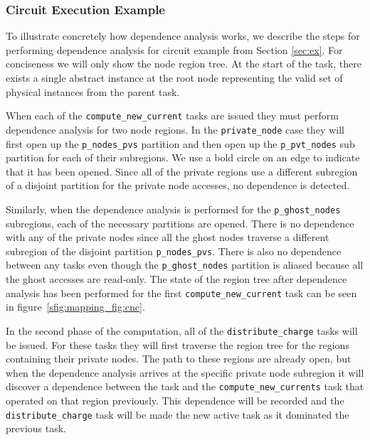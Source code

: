 \subsubsection{Circuit Execution Example}
\label{subsec:cirdependence}
To illustrate concretely how dependence analysis works, we describe the steps for
performing dependence analysis for circuit example from Section \ref{sec:ex}.  
For conciseness we will only show the node region tree.  At the start of the task, there exists
a single abstract instance at the root node representing the valid set of physical
instances from the parent task. 

When each of the {\tt compute\_new\_current} tasks are issued they must perform dependence
analysis for two node regions.  In the {\tt private\_node} case they will first open
up the {\tt p\_nodes\_pvs} partition and then open up the {\tt p\_pvt\_nodes} sub partition
for each of their subregions.  We use a bold circle on an edge to indicate that it has been
opened.  Since all of the private regions use a different subregion
of a disjoint partition for the private node accesses, no dependence is detected.  

Similarly, when the dependence analysis is performed for the {\tt p\_ghost\_nodes} subregions,
each of the necessary partitions are opened.  There is no dependence with any of the private
nodes since all the ghost nodes traverse a different subregion of the disjoint partition
{\tt p\_nodes\_pvs}.  There is also no dependence between any tasks even though the
{\tt p\_ghost\_nodes} partition is aliased because all the ghost accesses are read-only.
The state of the region tree after dependence analysis has been performed for the first
{\tt compute\_new\_current} task can be seen in figure~\ref{sfig:mapping_fig:cnc}.

In the second phase of the computation, all of the {\tt distribute\_charge} tasks
will be issued.  For these tasks they will first traverse the region tree
for the regions containing their private nodes.  The path to these regions are
already open, but when the dependence analysis arrives at the specific private node subregion it will
discover a dependence between the task and the {\tt compute\_new\_currents} task that operated
on that region previously.  This dependence will be recorded and the 
{\tt distribute\_charge} task will be made the new active task as it dominated the
previous task.  


